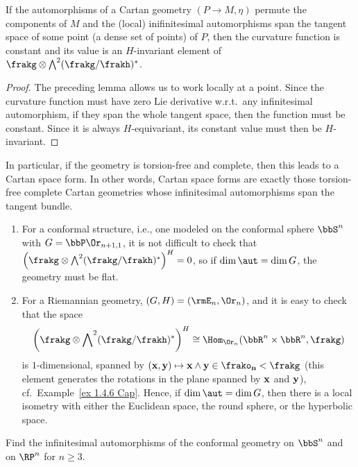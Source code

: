 \begin{cor}
    If the automorphisms of a Cartan geometry $(P\to M,\eta)$ permute the components of $M$ and the (local) inifinitesimal automorphisms span the tangent space of some point (a dense set of points) of $P$, then the curvature function is constant and its value is an $H$-invariant element of $\frakg\otimes \bigwedge\nolimits^2(\frakg\slash\frakh)^\ast$.
\end{cor}
\begin{proof}
    The preceding lemma allows us to work locally at a point. Since the curvature function must have zero Lie derivative w.r.t.\ any infinitesimal automorphism, if they span the whole tangent space, then the function must be constant. Since it is always $H$-equivariant, its constant value must then be $H$-invariant.
\end{proof}

In particular, if the geometry is torsion-free and complete, then this leads to a Cartan space form. In other words, Cartan space forms are exactly those torsion-free complete Cartan geometries whose infinitesimal automorphisms span the tangent bundle.

\begin{example}
    \begin{enumerate}
        \item For a conformal structure, i.e., one modeled on the conformal sphere $\bbS^n$ with $G=\bbP \Or_{n+1,1}$, it is not difficult to check that $\left(\frakg\otimes \bigwedge\nolimits^2(\frakg\slash\frakh)^\ast\right)^H=0$, so if $\dim \aut=\dim G$, the geometry must be flat.
        \item For a Riemannian geometry, $(G,H)=(\rmE_n,\Or_n)$, and it is easy to check that the space 
        \[\left(\frakg\otimes \bigwedge\nolimits^2(\frakg\slash\frakh)^\ast\right)^H\cong \Hom_{\Or_n}(\bbR^n\times\bbR^n,\frakg)\] 
        is $1$-dimensional, spanned by $(\bf{x},\bf{y})\mapsto \bf{x}\wedge\bf{y}\in\frako_n<\frakg$ (this element generates the rotations in the plane spanned by $\bf{x}$ and $\bf{y}$), cf.\ Example~\ref{ex 1.4.6 Cap}. Hence, if $\dim \aut=\dim G$, then there is a local isometry with either the Euclidean space, the round sphere, or the hyperbolic space.
    \end{enumerate}
\end{example}

\begin{xca}
    Find the infinitesimal automorphisms of the conformal geometry on $\bbS^n$ and on $\RP^n$ for $n\geq 3$.
\end{xca}


